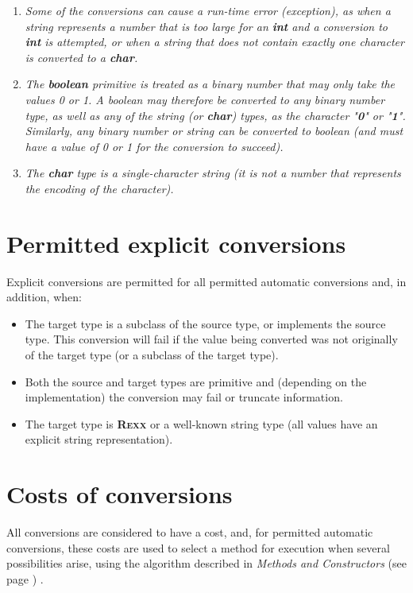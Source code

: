 \begin{enumerate}
\item \emph{Some of the conversions can cause a run-time error (exception), as
when a string represents a number that is too large for an \textbf{int}
and a conversion to \textbf{int} is attempted, or when a string that
does not contain exactly one character is converted to a
\textbf{char}.}
\item 
\emph{The \textbf{boolean} primitive is treated as a binary number that may
only take the values 0 or 1.
A boolean may therefore be converted to
any binary number type, as well as any of the string
(or \textbf{char}) types, as the character "\textbf{0}" or
"\textbf{1}".
Similarly, any binary number or string can be converted to boolean (and
must have a value of 0 or 1 for the conversion to succeed).}
\item 
\emph{The \textbf{char} type is a single-character string (it is not a
number that represents the encoding of the character).}
\end{enumerate}
\section{Permitted explicit conversions}
 
Explicit conversions are permitted for all permitted automatic
conversions and, in addition, when:
\begin{itemize}
\item 
The target type is a subclass of the source type, or implements
the source type.
This conversion will fail if the value being converted was not
originally of the target type (or a subclass of the target type).
\item 
Both the source and target types are primitive and (depending on the
implementation) the conversion may fail or truncate information.
\item 
The target type is \textbf{R\textsc{exx}} or a well-known string type (all
values have an explicit string representation).
\end{itemize}
\section{Costs of conversions}\label{refcosts}
 
All conversions are considered to have a cost, and, for permitted
automatic conversions, these costs are used to select a method for
execution when several possibilities arise, using the algorithm
described in  \emph{Methods and Constructors} (see page \pageref{refsmeth}) .
 
